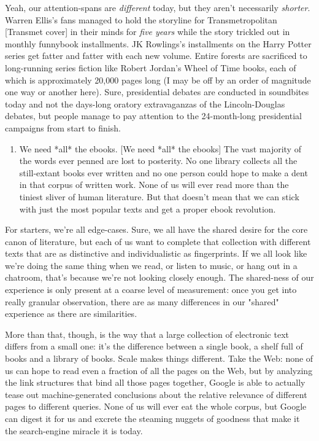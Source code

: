 Yeah, our attention-spans are \emph{different} today, but they
aren't necessarily \emph{shorter}. Warren Ellis's fans managed to
hold the storyline for Transmetropolitan [Transmet cover] in their
minds for \emph{five years} while the story trickled out in
monthly funnybook installments. JK Rowlings's installments on the
Harry Potter series get fatter and fatter with each new volume.
Entire forests are sacrificed to long-running series fiction like
Robert Jordan's Wheel of Time books, each of which is approximately
20,000 pages long (I may be off by an order of magnitude one way or
another here). Sure, presidential debates are conducted in
soundbites today and not the days-long oratory extravaganzas of the
Lincoln-Douglas debates, but people manage to pay attention to the
24-month-long presidential campaigns from start to finish.

\begin{enumerate}
\item
  We need *all* the ebooks. [We need *all* the ebooks] The vast
  majority of the words ever penned are lost to posterity. No one
  library collects all the still-extant books ever written and no one
  person could hope to make a dent in that corpus of written work.
  None of us will ever read more than the tiniest sliver of human
  literature. But that doesn't mean that we can stick with just the
  most popular texts and get a proper ebook revolution.
\end{enumerate}
For starters, we're all edge-cases. Sure, we all have the shared
desire for the core canon of literature, but each of us want to
complete that collection with different texts that are as
distinctive and individualistic as fingerprints. If we all look
like we're doing the same thing when we read, or listen to music,
or hang out in a chatroom, that's because we're not looking closely
enough. The shared-ness of our experience is only present at a
coarse level of measurement: once you get into really granular
observation, there are as many differences in our "shared"
experience as there are similarities.

More than that, though, is the way that a large collection of
electronic text differs from a small one: it's the difference
between a single book, a shelf full of books and a library of
books. Scale makes things different. Take the Web: none of us can
hope to read even a fraction of all the pages on the Web, but by
analyzing the link structures that bind all those pages together,
Google is able to actually tease out machine-generated conclusions
about the relative relevance of different pages to different
queries. None of us will ever eat the whole corpus, but Google can
digest it for us and excrete the steaming nuggets of goodness that
make it the search-engine miracle it is today.

